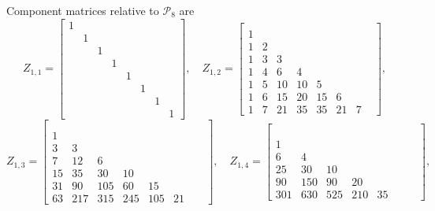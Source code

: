 \begin{example}
Component matrices relative to $\mathcal{P}_{8}$ are
\begin{displaymath}
Z_{1,1} = \left[\begin{matrix}1 &  &  &  &  &  &  & \\ & 1 &  &  &  &  &  & \\ &  & 1 &  &  &  &  & \\ &  &  & 1 &  &  &  & \\ &  &  &  & 1 &  &  & \\ &  &  &  &  & 1 &  & \\ &  &  &  &  &  & 1 & \\ &  &  &  &  &  &  & 1\end{matrix}\right], \quad Z_{1,2} = \left[\begin{matrix} &  &  &  &  &  &  & \\1 &  &  &  &  &  &  & \\1 & 2 &  &  &  &  &  & \\1 & 3 & 3 &  &  &  &  & \\1 & 4 & 6 & 4 &  &  &  & \\1 & 5 & 10 & 10 & 5 &  &  & \\1 & 6 & 15 & 20 & 15 & 6 &  & \\1 & 7 & 21 & 35 & 35 & 21 & 7 & \end{matrix}\right],
\end{displaymath}
\begin{displaymath}
Z_{1,3} = \left[\begin{matrix} &  &  &  &  &  &  & \\ &  &  &  &  &  &  & \\1 &  &  &  &  &  &  & \\3 & 3 &  &  &  &  &  & \\7 & 12 & 6 &  &  &  &  & \\15 & 35 & 30 & 10 &  &  &  & \\31 & 90 & 105 & 60 & 15 &  &  & \\63 & 217 & 315 & 245 & 105 & 21 &  & \end{matrix}\right], \quad Z_{1,4} = \left[\begin{matrix} &  &  &  &  &  &  & \\ &  &  &  &  &  &  & \\ &  &  &  &  &  &  & \\1 &  &  &  &  &  &  & \\6 & 4 &  &  &  &  &  & \\25 & 30 & 10 &  &  &  &  & \\90 & 150 & 90 & 20 &  &  &  & \\301 & 630 & 525 & 210 & 35 &  &  & \end{matrix}\right],

\end{displaymath}
\end{example}
